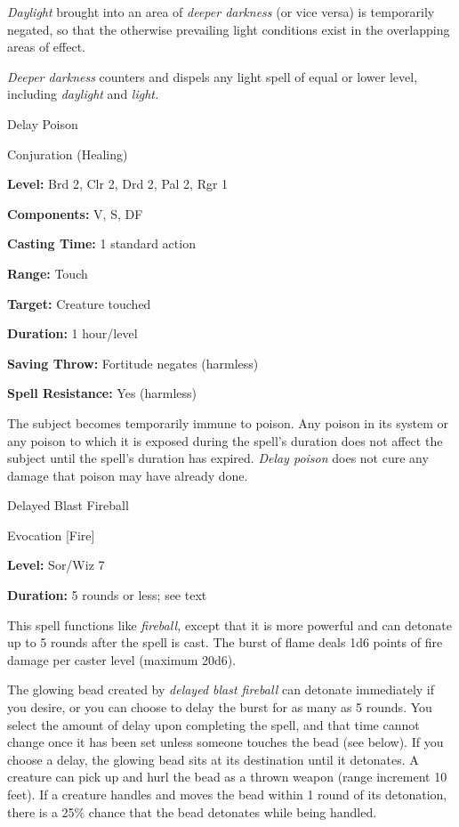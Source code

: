 \documentclass{article}
\begin{document}
\textit{Daylight }brought into an area of \textit{deeper darkness }(or vice versa) 
is temporarily negated, so that the otherwise prevailing light conditions exist 
in the overlapping areas of effect.

\textit{Deeper darkness }counters and dispels any light spell of equal or lower 
level, including \textit{daylight }and \textit{light.}

\vspace{12pt}
Delay Poison

Conjuration (Healing)

\textbf{Level:} Brd 2, Clr 2, Drd 2, Pal 2, Rgr 1

\textbf{Components:} V, S, DF

\textbf{Casting Time:} 1 standard action

\textbf{Range:} Touch

\textbf{Target:} Creature touched

\textbf{Duration:} 1 hour/level

\textbf{Saving Throw:} Fortitude negates (harmless)

\textbf{Spell Resistance:} Yes (harmless)

The subject becomes temporarily immune to poison. Any poison in its system or any 
poison to which it is exposed during the spell's duration does not affect the subject 
until the spell's duration has expired. \textit{Delay poison }does not cure any 
damage that poison may have already done.

\vspace{12pt}
Delayed Blast Fireball

Evocation [Fire]

\textbf{Level:} Sor/Wiz 7

\textbf{Duration:} 5 rounds or less; see text

This spell functions like \textit{fireball, }except that it is more powerful and 
can detonate up to 5 rounds after the spell is cast. The burst of flame deals 1d6 
points of fire damage per caster level (maximum 20d6).

The glowing bead created by \textit{delayed blast fireball }can detonate immediately 
if you desire, or you can choose to delay the burst for as many as 5 rounds. You 
select the amount of delay upon completing the spell, and that time cannot change 
once it has been set unless someone touches the bead (see below). If you choose 
a delay, the glowing bead sits at its destination until it detonates. A creature 
can pick up and hurl the bead as a thrown weapon (range increment 10 feet). If 
a creature handles and moves the bead within 1 round of its detonation, there is 
a 25\% chance that the bead detonates while being handled.
\end{document}
